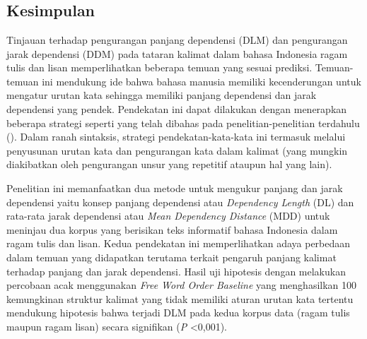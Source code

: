 \chapter{\kesimpulan}


\section{Kesimpulan}

Tinjauan terhadap pengurangan panjang dependensi (DLM) dan pengurangan jarak dependensi (DDM) pada tataran kalimat dalam bahasa Indonesia ragam tulis dan lisan memperlihatkan beberapa temuan yang sesuai prediksi. Temuan-temuan ini mendukung ide bahwa bahasa manusia memiliki kecenderungan untuk mengatur urutan kata sehingga memiliki panjang dependensi dan jarak dependensi yang pendek. Pendekatan ini dapat dilakukan dengan menerapkan beberapa strategi seperti yang telah dibahas pada penelitian-penelitian terdahulu (\citealp{jaeger2006redundancy, gildea2015human}). Dalam ranah sintaksis, strategi pendekatan-kata-kata ini termasuk melalui penyusunan urutan kata dan pengurangan kata dalam kalimat (yang mungkin diakibatkan oleh pengurangan unsur yang repetitif ataupun hal yang lain). 

Penelitian ini memanfaatkan dua metode untuk mengukur panjang dan jarak dependensi yaitu konsep panjang dependensi atau \textit{Dependency Length} (DL) dan rata-rata jarak dependensi atau \textit{Mean Dependency Distance} (MDD) untuk meninjau dua korpus yang berisikan teks informatif bahasa Indonesia dalam ragam tulis dan lisan. Kedua pendekatan ini memperlihatkan adaya perbedaan dalam temuan yang didapatkan terutama terkait pengaruh panjang kalimat terhadap panjang dan jarak dependensi. Hasil uji hipotesis dengan melakukan percobaan acak menggunakan \textit{Free Word Order Baseline} \citep{futrell2015large} yang menghasilkan 100 kemungkinan struktur kalimat yang tidak memiliki aturan urutan kata tertentu mendukung hipotesis bahwa terjadi DLM pada kedua korpus data (ragam tulis maupun ragam lisan) secara signifikan (\textit{P} \textless 0,001). 

